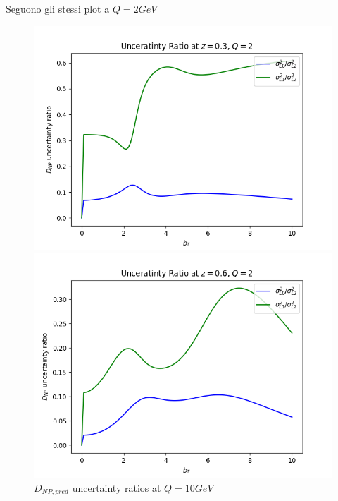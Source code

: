\documentclass{article}
\begin{document}
\begin{itemize}
    Seguono gli stessi plot a $Q=2 GeV$
       \begin{figure}[H]
    \centering
    \begin{minipage}{0.45\textwidth}
        \centering
        \includegraphics[width=\textwidth]{Images/unc_ratios/unc_ratio_D_NP_Q_2_z_0.3.png}
        \caption{$z = 0.3$}
    \end{minipage}\hfill
    \begin{minipage}{0.45\textwidth}
        \centering
        \includegraphics[width=\textwidth]{Images/unc_ratios/unc_ratio_D_NP_Q_2_z_0.6.png}
        \caption{$z=0.6$}
    \end{minipage}
    \caption{$D_{NP, pred}$ uncertainty ratios at $Q = 10 GeV$}
    \end{figure}


\end{itemize}
\end{document}
